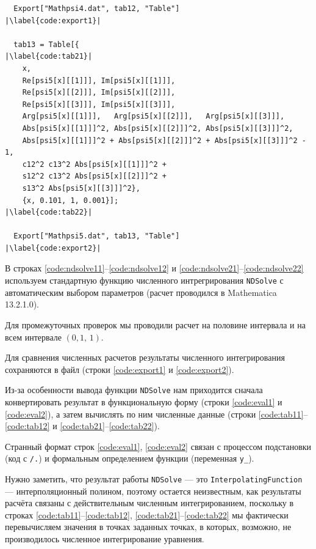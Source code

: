 \documentclass[a4paper,12pt]{article}
\begin{document}
\begin{verbatim}
  Export["Mathpsi4.dat", tab12, "Table"]                                     |\label{code:export1}|

  tab13 = Table[{                                                            |\label{code:tab21}|
    x,
    Re[psi5[x][[1]]], Im[psi5[x][[1]]],
    Re[psi5[x][[2]]], Im[psi5[x][[2]]],
    Re[psi5[x][[3]]], Im[psi5[x][[3]]],
    Arg[psi5[x][[1]]],   Arg[psi5[x][[2]]],   Arg[psi5[x][[3]]],
    Abs[psi5[x][[1]]]^2, Abs[psi5[x][[2]]]^2, Abs[psi5[x][[3]]]^2,
    Abs[psi5[x][[1]]]^2 + Abs[psi5[x][[2]]]^2 + Abs[psi5[x][[3]]]^2 - 1,
    c12^2 c13^2 Abs[psi5[x][[1]]]^2 +
    s12^2 c13^2 Abs[psi5[x][[2]]]^2 +
    s13^2 Abs[psi5[x][[3]]]^2},
    {x, 0.101, 1, 0.001}];                                                   |\label{code:tab22}|

  Export["Mathpsi5.dat", tab13, "Table"]                                     |\label{code:export2}|
\end{verbatim}

В строках \ref{code:ndsolve11}--\ref{code:ndsolve12} и
\ref{code:ndsolve21}--\ref{code:ndsolve22} используем стандартную функцию
численного интрегрирования \texttt{NDSolve} с автоматическим выбором
параметров (расчет проводился в Mathematica 13.2.1.0).

Для промежуточных проверок мы проводили расчет на половине интервала и на всем
интервале \((0,1{,}\,1)\).

Для сравнения численных расчетов результаты численного интегрирования
сохраняются в файл (строки \ref{code:export1} и \ref{code:export2}).

Из-за особенности вывода функции \texttt{NDSolve} нам приходится сначала
конвертировать результат в функциональную форму (строки \ref{code:eval1} и
\ref{code:eval2}), а затем вычислять по ним численные данные (строки
\ref{code:tab11}--\ref{code:tab12} и \ref{code:tab21}--\ref{code:tab22}).

Странный формат строк \ref{code:eval1}, \ref{code:eval2} связан с процессом
подстановки (код с \texttt{/.}) и формальным определением функции
(переменная \texttt{y_}).

Нужно заметить, что результат работы \texttt{NDSolve} — это
\texttt{InterpolatingFunction} — интерполяционный полином, поэтому
остается неизвестным, как результаты расчёта связаны с действительным численным
интегрированием, поскольку в строках \ref{code:tab11}--\ref{code:tab12},
\ref{code:tab21}--\ref{code:tab22} мы фактически перевычисляем значения в точках
заданных точках, в которых, возможно, не производилось численное интегрирование
уравнения.
\end{document}

